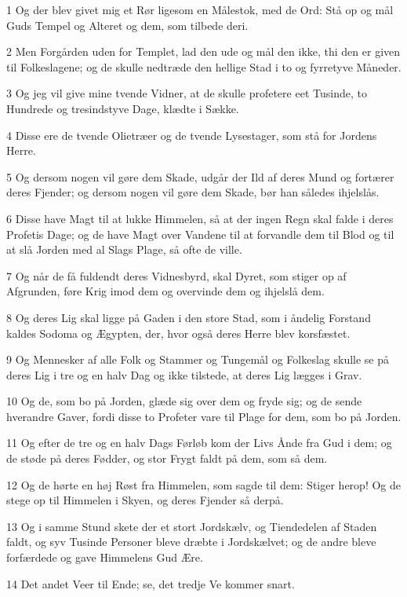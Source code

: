 \par 1 Og der blev givet mig et Rør ligesom en Målestok, med de Ord: Stå op og mål Guds Tempel og Alteret og dem, som tilbede deri.
\par 2 Men Forgården uden for Templet, lad den ude og mål den ikke, thi den er given til Folkeslagene; og de skulle nedtræde den hellige Stad i to og fyrretyve Måneder.
\par 3 Og jeg vil give mine tvende Vidner, at de skulle profetere eet Tusinde, to Hundrede og tresindstyve Dage, klædte i Sække.
\par 4 Disse ere de tvende Olietræer og de tvende Lysestager, som stå for Jordens Herre.
\par 5 Og dersom nogen vil gøre dem Skade, udgår der Ild af deres Mund og fortærer deres Fjender; og dersom nogen vil gøre dem Skade, bør han således ihjelslås.
\par 6 Disse have Magt til at lukke Himmelen, så at der ingen Regn skal falde i deres Profetis Dage; og de have Magt over Vandene til at forvandle dem til Blod og til at slå Jorden med al Slags Plage, så ofte de ville.
\par 7 Og når de få fuldendt deres Vidnesbyrd, skal Dyret, som stiger op af Afgrunden, føre Krig imod dem og overvinde dem og ihjelslå dem.
\par 8 Og deres Lig skal ligge på Gaden i den store Stad, som i åndelig Forstand kaldes Sodoma og Ægypten, der, hvor også deres Herre blev korsfæstet.
\par 9 Og Mennesker af alle Folk og Stammer og Tungemål og Folkeslag skulle se på deres Lig i tre og en halv Dag og ikke tilstede, at deres Lig lægges i Grav.
\par 10 Og de, som bo på Jorden, glæde sig over dem og fryde sig; og de sende hverandre Gaver, fordi disse to Profeter vare til Plage for dem, som bo på Jorden.
\par 11 Og efter de tre og en halv Dags Førløb kom der Livs Ånde fra Gud i dem; og de støde på deres Fødder, og stor Frygt faldt på dem, som så dem.
\par 12 Og de hørte en høj Røst fra Himmelen, som sagde til dem: Stiger herop! Og de stege op til Himmelen i Skyen, og deres Fjender så derpå.
\par 13 Og i samme Stund skete der et stort Jordskælv, og Tiendedelen af Staden faldt, og syv Tusinde Personer bleve dræbte i Jordskælvet; og de andre bleve forfærdede og gave Himmelens Gud Ære.
\par 14 Det andet Veer til Ende; se, det tredje Ve kommer snart.
